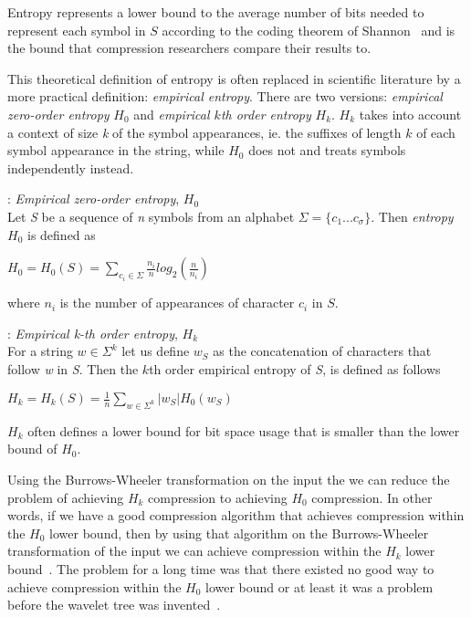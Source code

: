 Entropy represents a lower bound to the average number of bits needed to represent each symbol in $S$ according to the coding theorem of Shannon~\citep[Introduction]{WTSurvey} and is the bound that compression researchers compare their results to.

This theoretical definition of entropy is often replaced in scientific literature by a more practical definition: \textit{empirical entropy}.
There are two versions: \textit{empirical zero-order entropy} $H_0$ and \textit{empirical $k$th order entropy} $H_k$. $H_k$ takes into account a context of size \textit{k} of the symbol appearances, ie. the suffixes of length $k$ of each symbol appearance in the string, while $H_0$ does not and treats symbols independently instead. 

\begin{mdframed}[nobreak, linecolor=lightgray, linewidth=2pt]
\begin{definition}: \textit{Empirical zero-order entropy}, $H_0$ \\
Let \textit{S} be a sequence of \textit{n} symbols from an alphabet $\Sigma = \lbrace c_1 ... c_\sigma \rbrace$.
Then \textit{entropy} $H_0$ is defined as
\begin{center}
$H_0 = H_0(S) = \sum\limits_{c_i \in \Sigma} \frac{n_i}{n} log_2(\frac{n}{n_i})$
\end{center}
where $n_i$ is the number of appearances of character $c_i$ in $S$.
\end{definition}
\begin{definition}: \textit{Empirical k-th order entropy}, $H_k$ \\
For a string $w \in \Sigma^k$ let us define $w_S$ as the concatenation of characters that follow \textit{w} in \textit{S}. 
Then the $k$th order empirical entropy of \textit{S}, is defined as follows
\begin{center}
$H_k = H_k(S) = \frac{1}{n} \sum\limits_{w \in \Sigma^k} | w_S |H_0(w_S)$
\end{center}
\end{definition}
\end{mdframed}
$H_k$ often defines a lower bound for bit space usage that is smaller than the lower bound of $H_0$\citep[Section~2]{waveletTreeEntropy}.

Using the Burrows-Wheeler transformation on the input the we can reduce the problem of achieving $H_k$ compression to achieving $H_0$ compression.
In other words, if we have a good compression algorithm that achieves compression within the $H_0$ lower bound, then by using that algorithm on the Burrows-Wheeler transformation of the input we can achieve compression within the $H_k$ lower bound~\citep[Introduction]{waveletTreeEntropy}.
The problem for a long time was that there existed no good way to achieve compression within the $H_0$ lower bound or at least it was a problem before the wavelet tree was invented~\citep[Introduction]{waveletTreeEntropy}.

